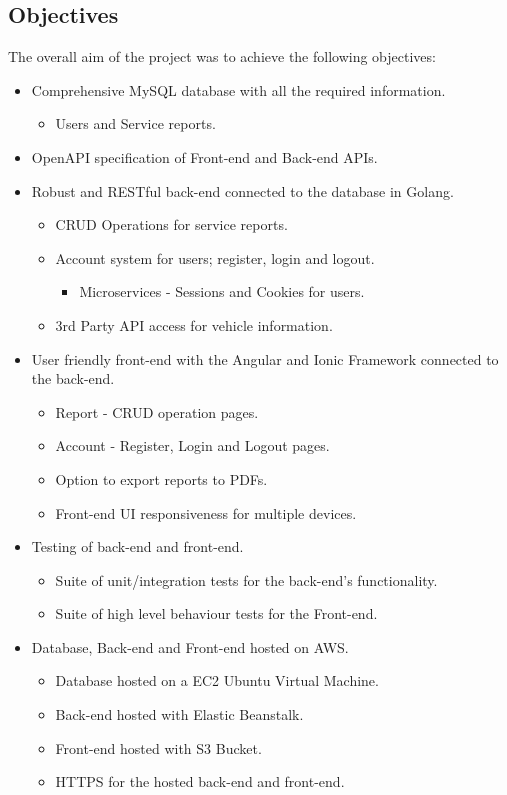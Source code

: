 \subsection{Objectives}
The overall aim of the project was to achieve the following objectives: 
\begin{itemize}
    \item Comprehensive MySQL database with all the required information.
     \begin{itemize} 
        \item Users and Service reports.
    \end{itemize}
    \item OpenAPI specification of Front-end and Back-end APIs.
    \item Robust and RESTful back-end connected to the database in Golang.
    \begin{itemize} 
        \item CRUD Operations for service reports.
        \item Account system for users; register, login and logout.
        \begin{itemize} 
            \item Microservices - Sessions and Cookies for users.
        \end{itemize}
        \item 3rd Party API access for vehicle information.
    \end{itemize}
    \item User friendly front-end with the Angular and Ionic Framework connected to the back-end.
    \begin{itemize} 
        \item Report - CRUD operation pages.
        \item Account - Register, Login and Logout pages.
        \item Option to export reports to PDFs.
        \item Front-end UI responsiveness for multiple devices.
    \end{itemize}
    \item Testing of back-end and front-end.
    \begin{itemize}
        \item Suite of unit/integration tests for the back-end's functionality.
        \item Suite of high level behaviour tests for the Front-end.
    \end{itemize}
    \item Database, Back-end and Front-end hosted on AWS.
    \begin{itemize} 
        \item Database hosted on a EC2 Ubuntu Virtual Machine.
        \item Back-end hosted with Elastic Beanstalk.
        \item Front-end hosted with S3 Bucket.
        \item HTTPS for the hosted back-end and front-end.
    \end{itemize}
\end{itemize}

